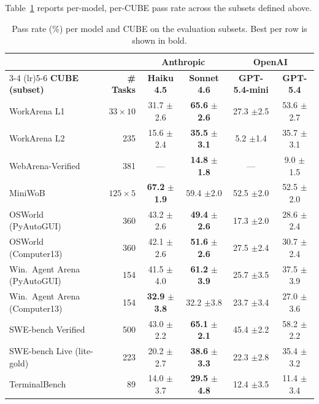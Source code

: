 \documentclass{article}
\newcommand{\SE}[1]{\,{\scriptsize\textcolor{gray!70}{$\pm$#1}}}
\newcommand{\NA}{\textcolor{gray!60}{---}}   %
\begin{document}
Table~\ref{tab:passrate} reports per-model, per-CUBE pass rate across
the subsets defined above.
%
\begin{table}[t]
\centering
\caption{Pass rate (\%) per model and CUBE on the evaluation subsets.
Best per row is shown in bold.}
\label{tab:passrate}
\small
\setlength{\tabcolsep}{5pt}
\renewcommand{\arraystretch}{1.05}
\begin{tabular}{lrcccc}
\toprule
& & \multicolumn{2}{c}{\textbf{Anthropic}} & \multicolumn{2}{c}{\textbf{OpenAI}} \\
\cmidrule(lr){3-4} \cmidrule(lr){5-6}
\textbf{CUBE (subset)} & \textbf{\# Tasks} & \textbf{Haiku 4.5} & \textbf{Sonnet 4.6} & \textbf{GPT-5.4-mini} & \textbf{GPT-5.4} \\
\midrule
WorkArena L1                    & $33{\times}10$ & 31.7\,\SE{2.6} & \textbf{65.6\,\SE{2.6}} & 27.3\,\SE{2.5} & 53.6\,\SE{2.7} \\
WorkArena L2                    & 235 & 15.6\,\SE{2.4} & \textbf{35.5\,\SE{3.1}} & 5.2\,\SE{1.4}  & 35.7\,\SE{3.1} \\
WebArena-Verified               & 381 & \NA             & \textbf{14.8\,\SE{1.8}} & \NA             & 9.0\,\SE{1.5}  \\
MiniWoB                         & $125{\times}5$ & \textbf{67.2\,\SE{1.9}} & 59.4\,\SE{2.0} & 52.5\,\SE{2.0} & 52.5\,\SE{2.0} \\
\midrule
OSWorld (PyAutoGUI)             & 360 & 43.2\,\SE{2.6} & \textbf{49.4\,\SE{2.6}} & 17.3\,\SE{2.0} & 28.6\,\SE{2.4} \\
OSWorld (Computer13)            & 360 & 42.1\,\SE{2.6} & \textbf{51.6\,\SE{2.6}} & 27.5\,\SE{2.4} & 30.7\,\SE{2.4} \\
Win.\ Agent Arena (PyAutoGUI)  & 154 & 41.5\,\SE{4.0} & \textbf{61.2\,\SE{3.9}} & 25.7\,\SE{3.5} & 37.5\,\SE{3.9} \\
Win.\ Agent Arena (Computer13) & 154 & \textbf{32.9\,\SE{3.8}} & 32.2\,\SE{3.8} & 23.7\,\SE{3.4} & 27.0\,\SE{3.6} \\
\midrule
SWE-bench Verified              & 500 & 43.0\,\SE{2.2} & \textbf{65.1\,\SE{2.1}} & 45.4\,\SE{2.2} & 58.2\,\SE{2.2} \\
SWE-bench Live (lite-gold)      & 223 & 20.2\,\SE{2.7} & \textbf{38.6\,\SE{3.3}} & 22.3\,\SE{2.8} & 35.4\,\SE{3.2} \\
TerminalBench                   &  89 & 14.0\,\SE{3.7} & \textbf{29.5\,\SE{4.8}} & 12.4\,\SE{3.5} & 11.4\,\SE{3.4} \\
\bottomrule
\end{tabular}
\end{table}
\end{document}
